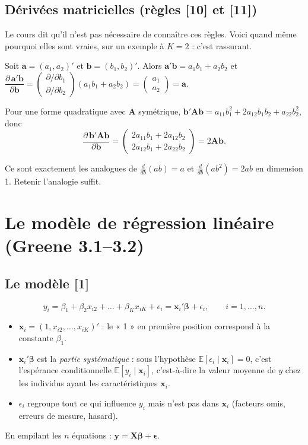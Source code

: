 \documentclass[11pt,a4paper]{article}
\newcommand{\vy}{\mathbf{y}}
\newcommand{\vX}{\mathbf{X}}
\newcommand{\vb}{\mathbf{b}}
\newcommand{\vx}{\mathbf{x}}
\newcommand{\vbeta}{\bm{\beta}}
\newcommand{\veps}{\bm{\epsilon}}
\newcommand{\A}{\mathbf{A}}
\newcommand{\E}{\mathbb{E}}
\begin{document}
\subsection{Dérivées matricielles (règles [10] et [11])}
Le cours dit qu'il n'est pas nécessaire de connaître ces règles. Voici quand même pourquoi elles sont vraies, sur un exemple à $K=2$ : c'est rassurant.

Soit $\mathbf{a}=(a_1,a_2)'$ et $\vb=(b_1,b_2)'$. Alors $\mathbf a'\vb=a_1b_1+a_2b_2$ et
$\dfrac{\partial\, \mathbf a'\vb}{\partial\vb}=\begin{pmatrix}\partial/\partial b_1\\ \partial/\partial b_2\end{pmatrix}(a_1b_1+a_2b_2)=\begin{pmatrix}a_1\\a_2\end{pmatrix}=\mathbf a.$

Pour une forme quadratique avec $\A$ symétrique, $\vb'\A\vb=a_{11}b_1^2+2a_{12}b_1b_2+a_{22}b_2^2$, donc
\[
\frac{\partial\,\vb'\A\vb}{\partial\vb}=\begin{pmatrix}2a_{11}b_1+2a_{12}b_2\\2a_{12}b_1+2a_{22}b_2\end{pmatrix}=2\A\vb .
\]
\begin{resultat}
Ce sont exactement les analogues de $\frac{d}{db}(ab)=a$ et $\frac{d}{db}(ab^2)=2ab$ en dimension 1. Retenir l'analogie suffit.
\end{resultat}

\section{Le modèle de régression linéaire (Greene 3.1--3.2)}

\subsection{Le modèle [1]}
\[
y_i=\beta_1+\beta_2x_{i2}+\dots+\beta_Kx_{iK}+\epsilon_i=\vx_i'\vbeta+\epsilon_i,\qquad i=1,\dots,n.
\]
\begin{itemize}
\item $\vx_i=(1,x_{i2},\dots,x_{iK})'$ : le « 1 » en première position correspond à la constante $\beta_1$.
\item $\vx_i'\vbeta$ est la \emph{partie systématique} : sous l'hypothèse $\E[\epsilon_i\mid\vx_i]=0$, c'est l'espérance conditionnelle $\E[y_i\mid\vx_i]$, c'est-à-dire la valeur moyenne de $y$ chez les individus ayant les caractéristiques $\vx_i$.
\item $\epsilon_i$ regroupe tout ce qui influence $y_i$ mais n'est pas dans $\vx_i$ (facteurs omis, erreurs de mesure, hasard).
\end{itemize}
En empilant les $n$ équations : $\vy=\vX\vbeta+\veps$.
\end{document}
